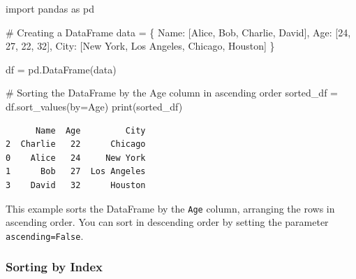 \documentclass[
  letterpaper,
  DIV=11,
  numbers=noendperiod]{scrreprt}
\newenvironment{Shaded}{\begin{snugshade}}{\end{snugshade}}
\newcommand{\BuiltInTok}[1]{\textcolor[rgb]{0.00,0.23,0.31}{#1}}
\newcommand{\CommentTok}[1]{\textcolor[rgb]{0.37,0.37,0.37}{#1}}
\newcommand{\DecValTok}[1]{\textcolor[rgb]{0.68,0.00,0.00}{#1}}
\newcommand{\ImportTok}[1]{\textcolor[rgb]{0.00,0.46,0.62}{#1}}
\newcommand{\NormalTok}[1]{\textcolor[rgb]{0.00,0.23,0.31}{#1}}
\newcommand{\OperatorTok}[1]{\textcolor[rgb]{0.37,0.37,0.37}{#1}}
\newcommand{\StringTok}[1]{\textcolor[rgb]{0.13,0.47,0.30}{#1}}
\begin{document}
\begin{Shaded}
\begin{Highlighting}[]
\ImportTok{import}\NormalTok{ pandas }\ImportTok{as}\NormalTok{ pd}

\CommentTok{\# Creating a DataFrame}
\NormalTok{data }\OperatorTok{=}\NormalTok{ \{}
    \StringTok{\textquotesingle{}Name\textquotesingle{}}\NormalTok{: [}\StringTok{\textquotesingle{}Alice\textquotesingle{}}\NormalTok{, }\StringTok{\textquotesingle{}Bob\textquotesingle{}}\NormalTok{, }\StringTok{\textquotesingle{}Charlie\textquotesingle{}}\NormalTok{, }\StringTok{\textquotesingle{}David\textquotesingle{}}\NormalTok{],}
    \StringTok{\textquotesingle{}Age\textquotesingle{}}\NormalTok{: [}\DecValTok{24}\NormalTok{, }\DecValTok{27}\NormalTok{, }\DecValTok{22}\NormalTok{, }\DecValTok{32}\NormalTok{],}
    \StringTok{\textquotesingle{}City\textquotesingle{}}\NormalTok{: [}\StringTok{\textquotesingle{}New York\textquotesingle{}}\NormalTok{, }\StringTok{\textquotesingle{}Los Angeles\textquotesingle{}}\NormalTok{, }\StringTok{\textquotesingle{}Chicago\textquotesingle{}}\NormalTok{, }\StringTok{\textquotesingle{}Houston\textquotesingle{}}\NormalTok{]}
\NormalTok{\}}

\NormalTok{df }\OperatorTok{=}\NormalTok{ pd.DataFrame(data)}

\CommentTok{\# Sorting the DataFrame by the \textquotesingle{}Age\textquotesingle{} column in ascending order}
\NormalTok{sorted\_df }\OperatorTok{=}\NormalTok{ df.sort\_values(by}\OperatorTok{=}\StringTok{\textquotesingle{}Age\textquotesingle{}}\NormalTok{)}
\BuiltInTok{print}\NormalTok{(sorted\_df)}
\end{Highlighting}
\end{Shaded}

\begin{verbatim}
      Name  Age         City
2  Charlie   22      Chicago
0    Alice   24     New York
1      Bob   27  Los Angeles
3    David   32      Houston
\end{verbatim}

This example sorts the DataFrame by the \texttt{Age} column, arranging
the rows in ascending order. You can sort in descending order by setting
the parameter \texttt{ascending=False}.

\hypertarget{sorting-by-index}{%
\subsubsection{Sorting by Index}\label{sorting-by-index}}
\end{document}
